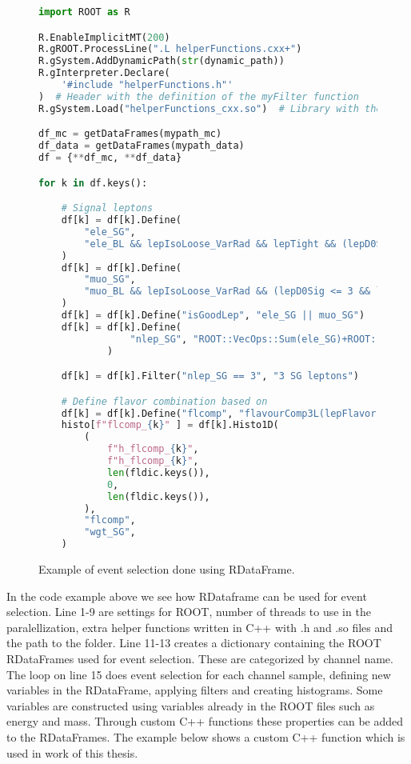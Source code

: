 \begin{figure}[H]
    \centering
\begin{lstlisting}[language=Python, style=pythonstyle, label={code:python_func_example}]
import ROOT as R

R.EnableImplicitMT(200)
R.gROOT.ProcessLine(".L helperFunctions.cxx+")
R.gSystem.AddDynamicPath(str(dynamic_path))
R.gInterpreter.Declare(
    '#include "helperFunctions.h"'
)  # Header with the definition of the myFilter function
R.gSystem.Load("helperFunctions_cxx.so")  # Library with the myFilter function

df_mc = getDataFrames(mypath_mc)
df_data = getDataFrames(mypath_data)
df = {**df_mc, **df_data}

for k in df.keys():

    # Signal leptons
    df[k] = df[k].Define(
        "ele_SG",
        "ele_BL && lepIsoLoose_VarRad && lepTight && (lepD0Sig <= 5 && lepD0Sig >= -5)",
    )  
    df[k] = df[k].Define(
        "muo_SG",
        "muo_BL && lepIsoLoose_VarRad && (lepD0Sig <= 3 && lepD0Sig >= -3)",
    )  
    df[k] = df[k].Define("isGoodLep", "ele_SG || muo_SG")
    df[k] = df[k].Define(
                "nlep_SG", "ROOT::VecOps::Sum(ele_SG)+ROOT::VecOps::Sum(muo_SG)"
            )

    df[k] = df[k].Filter("nlep_SG == 3", "3 SG leptons")

    # Define flavor combination based on 
    df[k] = df[k].Define("flcomp", "flavourComp3L(lepFlavor[ele_SG || muo_SG])")
    histo[f"flcomp_{k}" ] = df[k].Histo1D(
        (
            f"h_flcomp_{k}",
            f"h_flcomp_{k}",
            len(fldic.keys()),
            0,
            len(fldic.keys()),
        ),
        "flcomp",
        "wgt_SG",
    )
    \end{lstlisting}
    \caption[RDataFrame code example]{Example of event selection done using RDataFrame.}
    \label{code:rdata}
\end{figure}
In the code example above we see how RDataframe can be used for event selection. Line 1-9 are settings for ROOT, 
number of threads to use in the paralellization, extra helper functions written in C++ with .h and .so files and the path to the folder.
Line 11-13 creates a dictionary containing the ROOT RDataFrames used for event selection. These are categorized by channel name. 
The loop on line 15 does event selection for each channel sample, defining new variables in the RDataFrame, applying filters and creating histograms.
Some variables are constructed using variables already in the ROOT files such as energy and mass. Through custom C++ functions
these properties can be added to the RDataFrames. The example below shows a custom C++ function which is used in work of this thesis.

